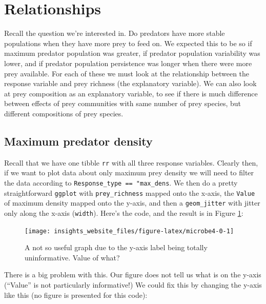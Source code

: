 \documentclass[]{book}
\begin{document}
\hypertarget{relationships-1}{%
\section{Relationships}\label{relationships-1}}

Recall the question we're interested in. Do predators have more stable populations when they have more prey to feed on. We expected this to be so if maximum predator population was greater, if predator population variability was lower, and if predator population persistence was longer when there were more prey available. For each of these we must look at the relationship between the response variable and prey richness (the explanatory variable). We can also look at prey composition as an explanatory variable, to see if there is much difference between effects of prey communities with same number of prey species, but different compositions of prey species.

\hypertarget{maximum-predator-density}{%
\subsection{Maximum predator density}\label{maximum-predator-density}}

Recall that we have one tibble \texttt{rr} with all three response variables. Clearly then, if we want to plot data about only maximum prey density we will need to filter the data according to \texttt{Response\_type\ ==\ "max\_dens}. We then do a pretty straightforward \texttt{ggplot} with \texttt{prey\_richness} mapped onto the x-axis, the \texttt{Value} of maximum density mapped onto the y-axis, and then a \texttt{geom\_jitter} with jitter only along the x-axis (\texttt{width}). Here's the code, and the result is in Figure \ref{fig:microbe4-0}:

\begin{figure}

{\centering \texttt{[image: insights\_website\_files/figure-latex/microbe4-0-1]} 

}

\caption{A not so useful graph due to the y-axis label being totally uninformative. Value of what?}\label{fig:microbe4-0}
\end{figure}

There is a big problem with this. Our figure does not tell us what is on the y-axis (``Value'' is not particularly informative!) We could fix this by changing the y-axis like this (no figure is presented for this code):
\end{document}
